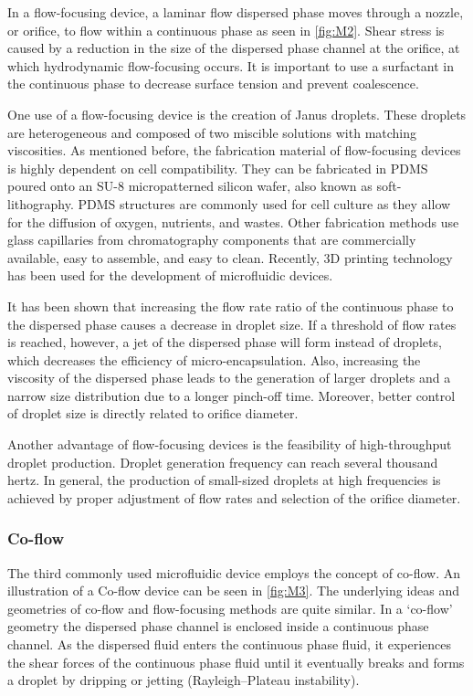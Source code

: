 \noindent In a flow-focusing device, a laminar flow dispersed phase moves through a nozzle, or orifice, to flow within a continuous phase as seen in \autoref{fig:M2}. Shear stress is caused by a reduction in the size of the dispersed phase channel at the orifice, at which hydrodynamic flow-focusing occurs. It is important to use a surfactant in the continuous phase to decrease surface tension and prevent coalescence. \parencite{Zhu2017}
\blankline

\noindent One use of a flow-focusing device is the creation of Janus droplets. These droplets are heterogeneous and composed of two miscible solutions with matching viscosities. \parencite{Xu2020} As mentioned before, the fabrication material of flow-focusing devices is highly dependent on cell compatibility. They can be fabricated in PDMS poured onto an SU-8 micropatterned silicon wafer, also known as soft-lithography. PDMS structures are commonly used for cell culture as they allow for the diffusion of oxygen, nutrients, and wastes. Other fabrication methods use glass capillaries from chromatography components that are commercially available, easy to assemble, and easy to clean. Recently, 3D printing technology has been used for the development of microfluidic devices. \parencite{Zhu2017}

It has been shown that increasing the flow rate ratio of the continuous phase to the dispersed phase causes a decrease in droplet size. If a threshold of flow rates is reached, however, a jet of the dispersed phase will form instead of droplets, which decreases the efficiency of micro-encapsulation. Also, increasing the viscosity of the dispersed phase leads to the generation of larger droplets and a narrow size distribution due to a longer pinch-off time. Moreover, better control of droplet size is directly related to orifice diameter. \parencite{Zhu2019}
\blankline

\noindent Another advantage of flow-focusing devices is the feasibility of high-throughput droplet production. Droplet generation frequency can reach several thousand hertz. In general, the production of small-sized droplets at high frequencies is achieved by proper adjustment of flow rates and selection of the orifice diameter. \parencite{Zhu2017,Pit2015}

\subsubsection{Co-flow}
The third commonly used microfluidic device employs the concept of co-flow. An illustration of a Co-flow device can be seen in \autoref{fig:M3}. The underlying ideas and geometries of co-flow and flow-focusing methods are quite similar. In a ‘co-flow’ geometry the dispersed phase channel is enclosed inside a continuous phase channel.  As the dispersed fluid enters the continuous phase fluid, it experiences the shear forces of the continuous phase fluid until it eventually breaks and forms a droplet by dripping or jetting (Rayleigh–Plateau instability). \parencite{Zhu2017, Pit2015}

